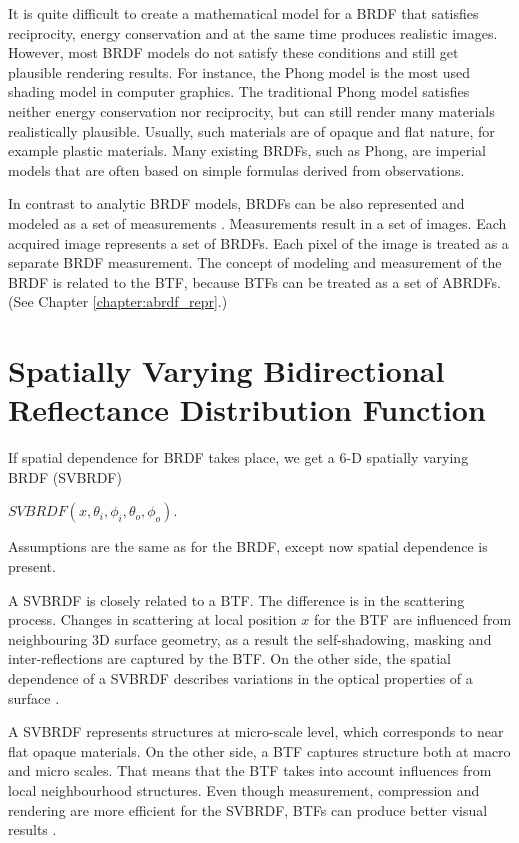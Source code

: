 It is quite difficult to create a mathematical model for a BRDF that satisfies reciprocity,
energy conservation and at the same time produces realistic images.
 However, most BRDF models do not satisfy these conditions and still get plausible rendering results.
For instance, the Phong model \cite{Phong} is the most used shading model in computer graphics. 
The traditional Phong model satisfies neither energy conservation nor reciprocity, but can still render many materials realistically plausible.
Usually, such materials are of opaque and flat nature, for example plastic materials.
Many existing BRDFs, such as Phong, are imperial models that are often based on simple formulas derived from observations. 

In contrast to analytic BRDF models, BRDFs can be also represented and modeled as a set of measurements \cite{MatusikPBM03}.
Measurements result in a set of images. Each acquired image represents a set of BRDFs.
Each pixel of the image is treated as a separate BRDF measurement.
The concept of modeling and measurement of the BRDF is related to the BTF, because BTFs can be treated as a set of ABRDFs. (See Chapter \ref{chapter:abrdf_repr}.)


\section{Spatially Varying Bidirectional Reflectance Distribution Function}
\label{section:svbrdf}
If spatial dependence for BRDF takes place, we get a 6-D spatially varying BRDF (SVBRDF)


 \begin{center}
$SVBRDF(x,\theta_{i} ,\phi_{i},\theta_{o} ,\phi_{o})$.
 \end{center}
 Assumptions are the same as for the BRDF, except now spatial dependence is present.
 
A SVBRDF is closely related to a BTF. The difference is in the scattering process. 
Changes in scattering at local position $x$ for the BTF are influenced from neighbouring 3D surface geometry, as a result the self-shadowing, masking and inter-reflections are captured by the BTF.
On the other side, the spatial dependence of a SVBRDF describes variations in the optical properties of a surface \cite{haindl_visual}.


 
A SVBRDF represents structures at micro-scale level, which corresponds to near flat opaque materials. On the other side, a BTF captures structure both at macro and micro scales.
 That means that the BTF takes into account influences from local neighbourhood structures. Even though measurement, compression and rendering are more efficient for the SVBRDF, 
  BTFs can produce better visual results \cite{haindl_visual}.
 
